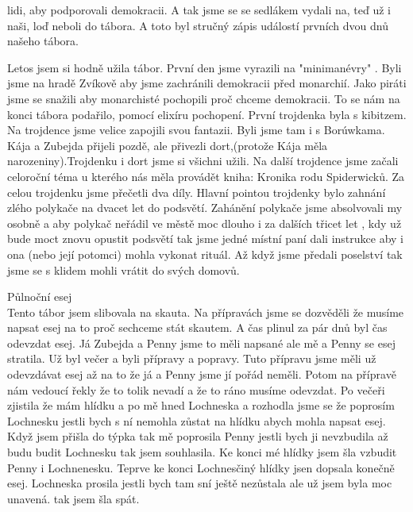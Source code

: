 \begin{multicols}{2}
lidi, aby podporovali demokracii. A tak jsme se se sedlákem vydali na, teď už i naši, loď neboli do tábora. A toto byl stručný zápis událostí prvních dvou dnů našeho tábora.




Letos jsem si hodně užila tábor. První den jsme vyrazili na "minimanévry" . Byli jsme na hradě Zvíkově aby jsme zachránili demokracii před monarchií. Jako piráti jsme se snažili aby monarchisté pochopili proč chceme demokracii. To se nám na konci tábora podařilo, pomocí elixíru pochopení.
První trojdenka byla s kibitzem. Na trojdence jsme velice zapojili svou fantazii.
Byli jsme tam i s Borúwkama. Kája a Zubejda přijeli pozdě, ale přivezli dort,(protože Kája měla narozeniny).Trojdenku i dort jsme si všichni užili.
Na další trojdence jsme začali celoroční téma u kterého nás měla provádět kniha: Kronika rodu Spiderwicků. Za celou trojdenku jsme přečetli dva díly. Hlavní pointou trojdenky bylo zahnání zlého polykače na dvacet let do podsvětí. Zahánění polykače jsme absolvovali my osobně a aby polykač neřádil ve městě moc dlouho i za dalších třicet let , kdy už bude moct znovu opustit podsvětí tak jsme jedné místní paní dali instrukce aby i ona (nebo její potomci) mohla vykonat rituál. Až když jsme předali poselství tak jsme se s klidem mohli vrátit do svých domovů.





Půlnoční esej\\
Tento tábor jsem slibovala na skauta.
Na přípravách jsme se dozvěděli že musíme napsat esej na to proč sechceme stát skautem.
A čas plinul za pár dnů byl čas odevzdat esej.
Já Zubejda a Penny jsme to měli napsané ale mě a Penny se esej stratila. Už byl večer a byli přípravy a popravy.
Tuto přípravu jsme měli už odevzdávat esej až na to že já a Penny jsme jí pořád neměli. Potom na přípravě nám vedoucí řekly že to tolik nevadí a že to ráno musíme odevzdat.
Po večeři zjistila že mám hlídku a po mě hned Lochneska a rozhodla jsme se že poprosím Lochnesku jestli bych s ní nemohla zůstat na hlídku abych mohla napsat esej.
Když jsem přišla do týpka tak mě poprosila Penny jestli bych ji nevzbudila až budu budit Lochnesku tak jsem souhlasila. Ke konci mé hlídky jsem šla vzbudit Penny i Lochnenesku. Teprve ke konci Lochnesčiný hlídky jsen dopsala konečně esej. Lochneska prosila jestli bych tam sní ještě nezůstala ale už jsem byla moc unavená. tak jsem šla spát.





\end{multicols}
